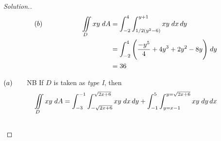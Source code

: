 \documentclass[11pt,a4paper]{article}
\theoremstyle{definition}
\newenvironment{solution}
  {\renewcommand{\qedsymbol}{}\begin{proof}[\textit{Solution}.]}
  {\end{proof}}
\begin{document}
\begin{solution}
\begin{align*}
(b)\hspace{2cm} \iint\limits_D xy\hspace{0.1cm} dA & = \int^4_{-2}\int^{y+1}_{1/2(y^2-6)}xy\hspace{0.1cm}dx\,dy\\
& = \int^4_{-2}\Bigg(\frac{-y^5}{4} + 4y^3 + 2y^2 - 8y\Bigg) \hspace{0.1cm}dy\\
& = 36\\
\end{align*}

$(a)\hspace{0.6cm}$ NB If $D$ is taken as \textit{type I}, then 
\begin{align*}
\iint\limits_D xy\hspace{0.1cm} dA = \int^{-1}_{-3}\int^{\sqrt{2x + 6}}_{-\sqrt{2x + 6}}xy \hspace{0.1cm}dx\,dy +  \int^{5}_{-1}\int^{y=\sqrt{2x + 6}}_{y = x -1}xy \hspace{0.1cm}dy\,dx\\\\ 
\end{align*}
\end{solution}
\end{document}
